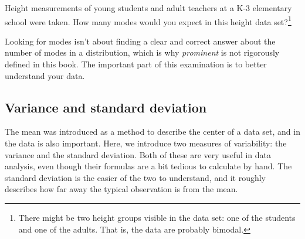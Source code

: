 %

\begin{exercise}
Height measurements of young students and adult teachers
at a K-3 elementary school were taken.
How many modes would you expect in this height data
set?\footnote{There might be two height groups visible
  in the data set: one of the students and one of the adults.
  That is, the data are probably bimodal.}
\end{exercise}

Looking for modes isn't about finding a clear and correct
answer about the number of modes in a distribution,
which is why \emph{prominent} is not
rigorously defined in this book.
The important part of this examination is to better
understand your data.



\subsection{Variance and standard deviation}
\label{variability}

The mean was introduced as a method to describe the center of a data set, and  in the data is also important. Here, we introduce two measures of variability: the variance and the standard deviation. Both of these are very useful in data analysis, even though their formulas are a bit tedious to calculate by hand. The standard deviation is the easier of the two to understand, and it roughly describes how far away the typical observation is from the mean.

